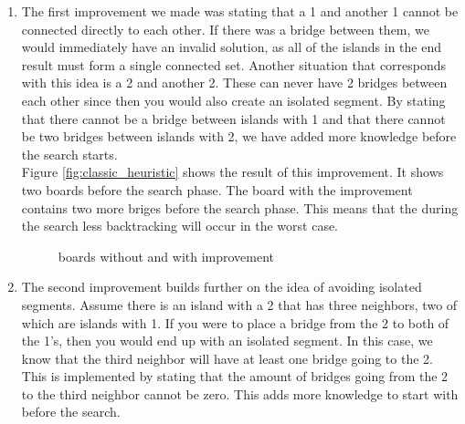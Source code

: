 \documentclass{report}
\begin{document}
\begin{enumerate}
	\item The first improvement we made was stating that a 1 and another 1 cannot be connected directly to each other. If there was a bridge between them, we would immediately have an invalid solution, as all of the islands in the end result must form a single connected set. Another situation that corresponds with this idea is a 2 and another 2. These can never have 2 bridges between each other since then you would also create an isolated segment. By stating that there cannot be a bridge between islands with 1 and that there cannot be two bridges between islands with 2, we have added more knowledge before the search starts. \\
	Figure \ref{fig:classic_heuristic} shows the result of this improvement. It shows two boards before the search phase. The board with the improvement contains two more briges before the search phase. This means that the during the search less backtracking will occur in the worst case.
	\begin{figure}[h]
        \centering
        \qquad
        \caption{boards without and with improvement}%
    \end{figure}

	\item The second improvement builds further on the idea of avoiding isolated segments.
	Assume there is an island with a 2 that has three neighbors, two of which are islands with 1. If you were to place a bridge from the 2 to both of the 1's, then you would end up with an isolated segment. In this case, we know that the third neighbor will have at least one bridge going to the 2. This is implemented by stating that the amount of bridges going from the 2 to the third neighbor cannot be zero. This adds more knowledge to start with before the search.


\end{enumerate}
\end{document}
